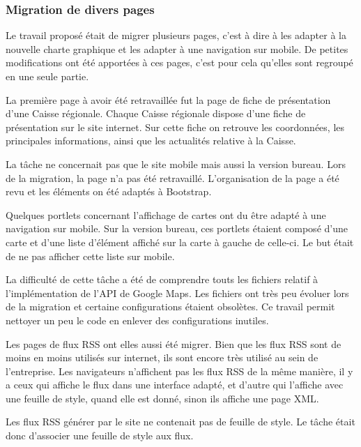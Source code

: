 \documentclass[12pt,a4paper]{article}
\begin{document}
\subsubsection{Migration de divers pages}
Le travail proposé était de migrer plusieurs pages, c'est à dire à les adapter à la nouvelle charte graphique et les adapter à une navigation sur mobile. De petites modifications ont été apportées à ces pages, c'est pour cela qu'elles sont regroupé en une seule partie.\par 
\bigskip
La première page à avoir été retravaillée fut la page de fiche de présentation d'une Caisse régionale. Chaque Caisse régionale dispose d'une fiche de présentation sur le site internet. Sur cette fiche on retrouve les coordonnées, les principales informations, ainsi que les actualités relative à la Caisse.\par 
La tâche ne concernait pas que le site mobile mais aussi la version bureau. Lors de la migration, la page n'a pas été retravaillé. L'organisation de la page a été revu et les éléments on été adaptés à Bootstrap.\par 
\bigskip
Quelques portlets concernant l'affichage de cartes ont du être adapté à une navigation sur mobile. Sur la version bureau, ces portlets étaient composé d'une carte et d'une liste d'élément affiché sur la carte à gauche de celle-ci. Le but était de ne pas afficher cette liste sur mobile.\par 
La difficulté de cette tâche a été de comprendre touts les fichiers relatif à l'implémentation de l'API de Google Maps. Les fichiers ont très peu évoluer lors de la migration et certaine configurations étaient obsolètes. Ce travail permit nettoyer un peu le code en enlever des configurations inutiles.\par
\bigskip
Les pages de flux RSS ont elles aussi été migrer. Bien que les flux RSS sont de moins en moins utilisés sur internet, ils sont encore très utilisé au sein de l'entreprise. Les navigateurs n'affichent pas les flux RSS de la même manière, il y a ceux qui affiche le flux dans une interface adapté, et d'autre qui l'affiche avec une feuille de style, quand elle est donné, sinon ils affiche une page XML.\par 
Les flux RSS générer par le site ne contenait pas de feuille de style. Le tâche était donc d'associer une feuille de style aux flux.\par
\end{document}
